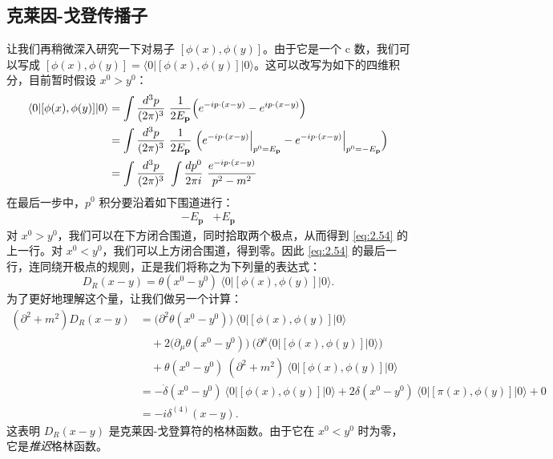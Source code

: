 \subsection{克莱因-戈登传播子}

让我们再稍微深入研究一下对易子 $[\phi(x), \phi(y)]$。由于它是一个 c 数，我们可以写成 $[\phi(x), \phi(y)] = \langle 0|[\phi(x), \phi(y)]|0\rangle$。这可以改写为如下的四维积分，目前暂时假设 $x^0>y^0$：
\begin{align}
  \langle 0|[\phi(x), \phi(y)]|0\rangle
  &= \int \frac{d^3p}{(2\pi)^3}\
    \frac{1}{2E_{\mathbf{p}}}\Bigl( e^{-ip\cdot(x-y)} - e^{ip\cdot(x-y)}
      \Bigr)\\
  &= \int \frac{d^3p}{(2\pi)^3}\ \frac{1}{2E_{\mathbf{p}}}\
    \Bigl( e^{-ip\cdot(x-y)}\Big|_{p^0=E_{\mathbf{p}}}
      - e^{-ip\cdot(x-y)}\Big|_{p^0=-E_{\mathbf{p}}} \Bigr)\\
  &= \int \frac{d^3p}{(2\pi)^3}\ \int \frac{dp^0}{2\pi i}\
    \frac{e^{-ip\cdot(x-y)}}{p^2-m^2}
  \label{eq:2.54}
\end{align}
在最后一步中，$p^0$ 积分要沿着如下围道进行：
\[
  \begin{array}{cc}
    -E_{\mathbf{p}} & +E_{\mathbf{p}}
  \end{array}
\]
对 $x^0>y^0$，我们可以在下方闭合围道，同时拾取两个极点，从而得到 \eqref{eq:2.54} 的上一行。对 $x^0<y^0$，我们可以上方闭合围道，得到零。因此 \eqref{eq:2.54} 的最后一行，连同绕开极点的规则，正是我们将称之为下列量的表达式：
\begin{equation}
  D_R(x-y) = \theta(x^0-y^0)\ \langle 0|[\phi(x), \phi(y)]|0\rangle .
  \label{eq:2.55}
\end{equation}
为了更好地理解这个量，让我们做另一个计算：
\begin{align}
  (\partial^2 + m^2)D_R(x-y)
  &= \bigl(\partial^2\theta(x^0-y^0)\bigr)\ \langle 0|[\phi(x), \phi(y)]|0\rangle\\
  &\quad + 2\bigl(\partial_\mu\theta(x^0-y^0)\bigr)\
    \bigl(\partial^\mu\langle 0|[\phi(x), \phi(y)]|0\rangle\bigr)\\
  &\quad + \theta(x^0-y^0)\ (\partial^2+m^2)\ \langle 0|[\phi(x), \phi(y)]|0\rangle\\
  &= -\dot{\delta}(x^0-y^0)\ \langle 0|[\phi(x), \phi(y)]|0\rangle
    + 2\delta(x^0-y^0)\ \langle 0|[\pi(x), \phi(y)]|0\rangle + 0\\
  &= -i\delta^{(4)}(x-y).
  \label{eq:2.56}
\end{align}
这表明 $D_R(x-y)$ 是克莱因-戈登算符的格林函数。由于它在 $x^0<y^0$ 时为零，它是\emph{推迟}格林函数。

